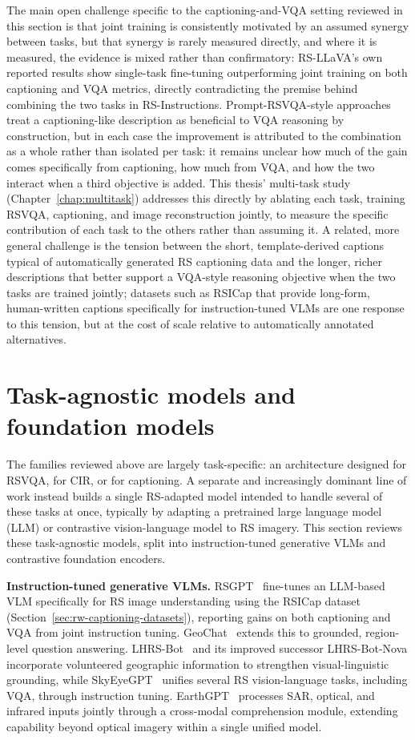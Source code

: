 The main open challenge specific to the captioning-and-VQA setting reviewed in this section is that joint training is consistently motivated by an assumed synergy between tasks, but that synergy is rarely measured directly, and where it is measured, the evidence is mixed rather than confirmatory: RS-LLaVA's own reported results show single-task fine-tuning outperforming joint training on both captioning and VQA metrics, directly contradicting the premise behind combining the two tasks in RS-Instructions. Prompt-RSVQA-style approaches treat a captioning-like description as beneficial to VQA reasoning by construction, but in each case the improvement is attributed to the combination as a whole rather than isolated per task: it remains unclear how much of the gain comes specifically from captioning, how much from VQA, and how the two interact when a third objective is added. This thesis' multi-task study (Chapter~\ref{chap:multitask}) addresses this directly by ablating each task, training RSVQA, captioning, and image reconstruction jointly, to measure the specific contribution of each task to the others rather than assuming it. A related, more general challenge is the tension between the short, template-derived captions typical of automatically generated RS captioning data and the longer, richer descriptions that better support a VQA-style reasoning objective when the two tasks are trained jointly; datasets such as RSICap that provide long-form, human-written captions specifically for instruction-tuned VLMs are one response to this tension, but at the cost of scale relative to automatically annotated alternatives.
\section{Task-agnostic models and foundation models}
\label{sec:rw-foundation}

The families reviewed above are largely task-specific: an architecture designed for RSVQA, for CIR, or for captioning. A separate and increasingly dominant line of work instead builds a single RS-adapted model intended to handle several of these tasks at once, typically by adapting a pretrained large language model (LLM) or contrastive vision-language model to RS imagery. This section reviews these task-agnostic models, split into instruction-tuned generative VLMs and contrastive foundation encoders.

\textbf{Instruction-tuned generative VLMs.} RSGPT~\cite{hu2023rsgpt} fine-tunes an LLM-based VLM specifically for RS image understanding using the RSICap dataset (Section~\ref{sec:rw-captioning-datasets}), reporting gains on both captioning and VQA from joint instruction tuning. GeoChat~\cite{kuckreja2024geochat} extends this to grounded, region-level question answering. LHRS-Bot~\cite{muhtar2025lhrsbot} and its improved successor LHRS-Bot-Nova incorporate volunteered geographic information to strengthen visual-linguistic grounding, while SkyEyeGPT~\cite{zhan2025skyeyegpt} unifies several RS vision-language tasks, including VQA, through instruction tuning. EarthGPT~\cite{zhang2024earthgpt} processes SAR, optical, and infrared inputs jointly through a cross-modal comprehension module, extending capability beyond optical imagery within a single unified model.

